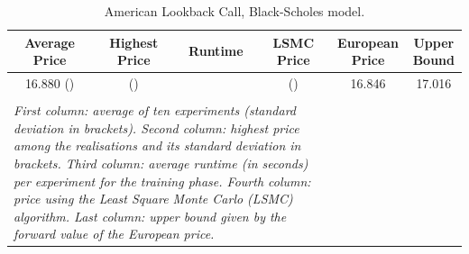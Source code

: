 \begin{table}[ht]
  \centering
  \caption{American Lookback Call, Black-Scholes model.  
 }
 
 \vspace{-2mm}
 
  \begin{tabular}{cccccc}
 \hline \hline
    Average Price  & Highest Price & Runtime  & LSMC Price & European Price & Upper Bound\\
  \hline  \hline 
  16.880   ()  &  () &  & () &  16.846 & 17.016 \\
  \hline \\[-1em]
  \multicolumn{4}{l}{%
  \begin{minipage}{9.cm}%
    \tiny \textit{First  column:  average  of ten experiments (standard deviation in brackets). Second column: highest price  among the realisations and its standard deviation in brackets.  Third column:  average runtime (in seconds) per experiment for the training phase. Fourth column: price using the Least Square Monte Carlo (LSMC) algorithm. Last column: upper bound given by the forward value of the European price. }%
  \end{minipage}%
}
\end{tabular}
\vspace{2mm}
\label{tab:resultLkbk}
  \end{table}

